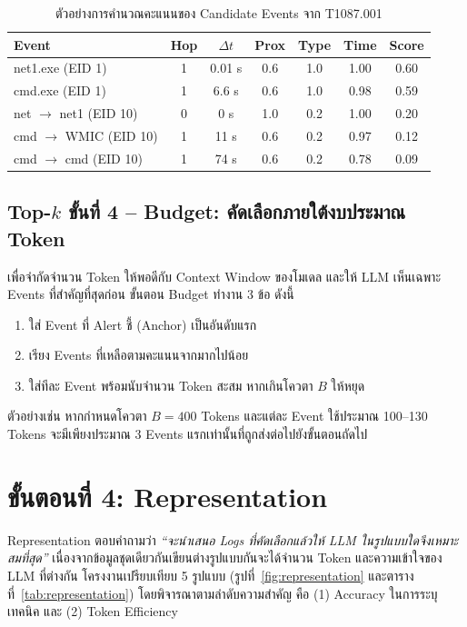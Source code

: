 \begin{table}[ht]
  \centering
  \caption{ตัวอย่างการคำนวณคะแนนของ Candidate Events จาก T1087.001}
  \label{tab:score-example}
  \begin{tabular}{|l|c|c|c|c|c|c|}
    \hline
    \textbf{Event} & \textbf{Hop} & \textbf{$\Delta t$} & \textbf{Prox} & \textbf{Type} & \textbf{Time} & \textbf{Score} \\ \hline
    net1.exe (EID 1)         & 1 & 0.01 s & 0.6 & 1.0 & 1.00 & 0.60 \\ \hline
    cmd.exe (EID 1)          & 1 & 6.6 s  & 0.6 & 1.0 & 0.98 & 0.59 \\ \hline
    net $\rightarrow$ net1 (EID 10) & 0 & 0 s & 1.0 & 0.2 & 1.00 & 0.20 \\ \hline
    cmd $\rightarrow$ WMIC (EID 10) & 1 & 11 s & 0.6 & 0.2 & 0.97 & 0.12 \\ \hline
    cmd $\rightarrow$ cmd (EID 10)  & 1 & 74 s & 0.6 & 0.2 & 0.78 & 0.09 \\ \hline
  \end{tabular}
\end{table}

\subsection{Top-$k$ ขั้นที่ 4 -- Budget: คัดเลือกภายใต้งบประมาณ Token}
เพื่อจำกัดจำนวน Token ให้พอดีกับ Context Window ของโมเดล และให้ LLM เห็นเฉพาะ Events ที่สำคัญที่สุดก่อน
ขั้นตอน Budget ทำงาน 3 ข้อ ดังนี้
\begin{enumerate}
  \item ใส่ Event ที่ Alert ชี้ (Anchor) เป็นอันดับแรก
  \item เรียง Events ที่เหลือตามคะแนนจากมากไปน้อย
  \item ใส่ทีละ Event พร้อมนับจำนวน Token สะสม หากเกินโควตา $B$ ให้หยุด
\end{enumerate}
ตัวอย่างเช่น หากกำหนดโควตา $B = 400$ Tokens และแต่ละ Event ใช้ประมาณ 100--130 Tokens
จะมีเพียงประมาณ 3 Events แรกเท่านั้นที่ถูกส่งต่อไปยังขั้นตอนถัดไป

\section{ขั้นตอนที่ 4: Representation}

Representation ตอบคำถามว่า \emph{``จะนำเสนอ Logs ที่คัดเลือกแล้วให้ LLM ในรูปแบบใดจึงเหมาะสมที่สุด''}
เนื่องจากข้อมูลชุดเดียวกันเขียนต่างรูปแบบกันจะได้จำนวน Token และความเข้าใจของ LLM ที่ต่างกัน
โครงงานเปรียบเทียบ 5 รูปแบบ (รูปที่~\ref{fig:representation} และตารางที่~\ref{tab:representation})
โดยพิจารณาตามลำดับความสำคัญ คือ (1) Accuracy ในการระบุเทคนิค และ (2) Token Efficiency

